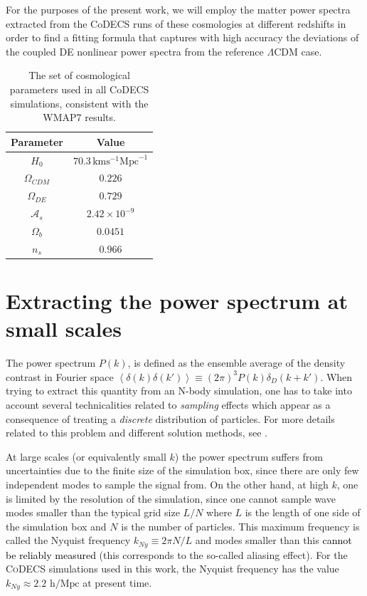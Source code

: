 For the purposes of the present work, we will employ the matter power
spectra extracted from the CoDECS runs of these cosmologies at different
redshifts in order to find a fitting formula that captures with high
accuracy the deviations of the coupled DE nonlinear power spectra
from the reference $\Lambda$CDM case.

\begin{table}
	\footnotesize
\centering{}%
\begin{tabular}{cc}
\textbf{Parameter}  & \textbf{Value} \tabularnewline
\hline 
$H_{0}$  & $70.3\,\mbox{km}\mbox{s}^{-1}\mbox{Mpc}^{-1}$ \tabularnewline
$\Omega_{CDM}$  & $0.226$ \tabularnewline
$\Omega_{DE}$  & $0.729$ \tabularnewline
$\mathcal{A}_{s}$  & $2.42\times10^{-9}$ \tabularnewline
$\Omega_{b}$  & $0.0451$ \tabularnewline
$n_{s}$  & $0.966$ \tabularnewline
\hline 
\end{tabular}\protect\protect\caption{ \label{tab:ParametersWMAP7}The set of cosmological parameters used
in all CoDECS simulations, consistent with the WMAP7 results.}
\end{table}
\normalsize





\section{\label{sec:Folding-method}Extracting the power spectrum at small
scales}


The power spectrum $P(k)$, is defined as the ensemble average of
the density contrast in Fourier space $\left\langle \delta(k)\delta(k')\right\rangle \equiv(2\pi)^{3}P(k)\delta_{D}(k+k')$.
When trying to extract this quantity from an N-body simulation, one
has to take into account several technicalities related to \emph{sampling}
effects which appear as a consequence of treating a \emph{discrete
}distribution of particles. For more details related to this problem
and different solution methods, see \citep{cui_ideal_2008}.

At large scales (or equivalently small $k$) the power spectrum suffers
from uncertainties due to the finite size of the simulation box, since
there are only few independent modes to sample the signal from. On
the other hand, at high $k$, one is limited by the resolution of
the simulation, since one cannot sample wave modes smaller than the
typical grid size $L/N$ where $L$ is the length of one side of the
simulation box and $N$ is the number of particles. This maximum frequency
is called the Nyquist frequency $k_{Ny}\equiv2\pi N/L$ and modes
smaller than this \textcolor{black}{cannot be reliably measured} (this
corresponds to the so-called aliasing effect). For the \textsc{CoDECS} simulations
used in this work, the Nyquist frequency has the value $k_{Ny}\approx2.2$
$\mbox{h}/\mbox{Mpc}$ at present time.

